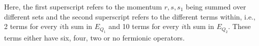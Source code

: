 \documentclass[sn-mathphys, Numbered ,a4paper]{sn-jnl}%
\DeclareMathOperator{\Z}{\mathbb{Z}}
\theoremstyle{plain}
\theoremstyle{definition}
\theoremstyle{remark}
\theoremstyle{plain}
\theoremstyle{definition}
\theoremstyle{remark}
\begin{document}
\begin{comment}
\begin{alignat}{2}
   2E_{Q_2}(A) &=
    \!\!\!\sum\limits_{\ell,\ell_1 \in \Z^3_*}\sum\limits_{\substack{r\in L_{\ell} \cap L_{\ell_1}\\ s \in L_{\ell},s_1\in L_{\ell_1}}} \!\!\!\begin{aligned}[t] &A(\ell)_{r,s}K(\ell_1)_{r,s_1}\Big( 4a^*_{r_1-\ell_1} b^*_{-s_1}(-\ell_1) b_{-s}(-\ell) a_{ r-\ell}\nonumber\\ 
    &\; + 2a^*_{  r_1-\ell_1}[b_{-s}(-\ell),b^*_{-s_1}(-\ell_1)]a_{ r-\ell} + 2a^*_{r_1-\ell_1}[b_{-s_1}(-\ell_1),a^*_{ r-\ell}]^* b_{-s}(-\ell) \nonumber\\
    &\; + a^*_{  r_1-\ell_1}\big[b_{-s}(-\ell),[b_{-s_1}(-\ell_1),a^*_{ r-\ell}]^*\big] + 2b^*_{-s_1}(-\ell_1)[b_{-s}(-\ell),a^*_{  r_1-\ell_1}]a_{ r-\ell}\nonumber\\
    &\; +2\big[b_{-s_1}(-\ell_1),[b_{-s}(-\ell),a^*_{  r_1-\ell_1}]^*\big]^*a_{ r-\ell} - [ b_{-s_1}(-\ell_1), a^*_{ r-\ell}]^* [b_{-s}(-\ell), a^*_{r_1-\ell_1}]  \nonumber\\
    &\; + \big\{ [b_{-s}(-\ell),a^*_{  r_1-\ell_1}],[b_{-s_1}(-\ell_1), a^*_{ r-\ell}]^* \big\} \Big)    
    \end{aligned}\\
    &\quad +\!\!\!\sum\limits_{\ell,\ell_1 \in \Z^3_*}\sum\limits_{\substack{r\in (L_{\ell}-\ell)\\ \cap \\(L_{\ell_1}-\ell_1)\\ s \in L_{\ell},s_1\in L_{\ell_1}}}\!\!\!\begin{aligned}[t] &A(\ell)_{r+\ell,s} K(\ell_1)_{r+\ell_1,s_1}\Big( 4a^*_{r_1+\ell_1} b^*_{-s_1}(-\ell_1) b_{-s}(-\ell) a_{ r+\ell}\nonumber\\ 
    	&\; + 2a^*_{  r_1+\ell_1}[b_{-s}(-\ell),b^*_{-s_1}(-\ell_1)]a_{ r+\ell} + 2a^*_{r_1+\ell_1}[b_{-s_1}(-\ell_1),a^*_{ r+\ell}]^* b_{-s}(-\ell) \nonumber\\
    	&\; + a^*_{  r_1+\ell_1}\big[b_{-s}(-\ell),[b_{-s_1}(-\ell_1),a^*_{ r+\ell}]^*\big] + 2b^*_{-s_1}(-\ell_1)[b_{-s}(-\ell),a^*_{  r_1+\ell_1}]a_{ r+\ell}\nonumber\\
    	&\; +2\big[b_{-s_1}(-\ell_1),[b_{-s}(-\ell),a^*_{  r_1+\ell_1}]^*\big]^*a_{ r+\ell} - [ b_{-s_1}(-\ell_1), a^*_{ r+\ell}]^* [b_{-s}(-\ell), a^*_{r_1+\ell_1}]  \nonumber\\
    	&\; + \big\{ [b_{-s}(-\ell),a^*_{  r_1+\ell_1}],[b_{-s_1}(-\ell_1), a^*_{ r+\ell}]^* \big\}  \Big)   
    \end{aligned}\\
    &\phantom{=\;} +\mathrm{h.c.} -2\sum\limits_{\ell \in \Z^3_*}\sum\limits_{r,s \in L_{\ell}}\big\{ A(\ell)_,K(\ell)\big\}_{r,s}\epsilon_{r,s}(\ell,\ell).
\end{alignat}
\end{comment}
Here, the first superscript refers to the momentum $r,s,s_1$ being summed over different sets and the second superscript refers to the different terms within, i.e., 2 terms for every $i\mathrm{th}$ sum in $E_{Q_1}$ and 10 terms for every $i\mathrm{th}$ sum in $E_{Q_2}$. These terms either have six, four, two or no fermionic operators.
\end{document}
